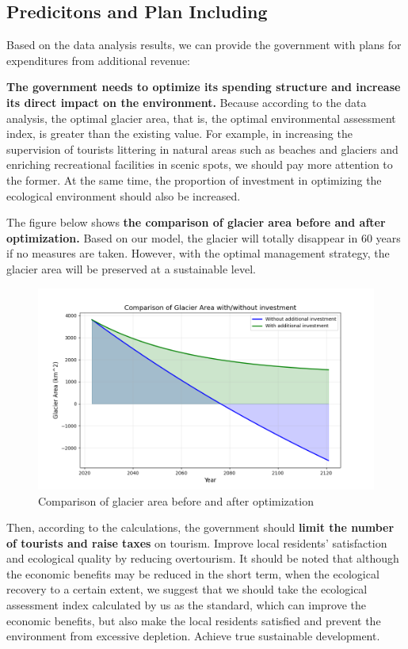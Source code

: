 \documentclass[UTF8]{mcmthesis}
\begin{document}
        \subsection{Predicitons and Plan Including}
		Based on the data analysis results, we can provide the government with plans for expenditures from additional revenue:

		\textbf{The government needs to optimize its spending structure and increase its direct impact on the environment.} Because according to the data analysis, the optimal glacier area, that is, the optimal environmental assessment index, is greater than the existing value. For example, in increasing the supervision of tourists littering in natural areas such as beaches and glaciers and enriching recreational facilities in scenic spots, we should pay more attention to the former. At the same time, the proportion of investment in optimizing the ecological environment should also be increased.
		
        The figure below shows \textbf{the comparison of glacier area before and after optimization.} Based on our model, the glacier will totally disappear in 60 years if no measures are taken. However, with the optimal management strategy, the glacier area will be preserved at a sustainable level.
        \begin{figure}[htbp]
            \centering
            \includegraphics[width=13cm]{predict.png}
            \caption{Comparison of glacier area before and after optimization}
        \end{figure}
        
        Then, according to the calculations, the government should \textbf{limit the number of tourists and raise taxes} on tourism. Improve local residents' satisfaction and ecological quality by reducing overtourism. It should be noted that although the economic benefits may be reduced in the short term, when the ecological recovery to a certain extent, we suggest that we should take the ecological assessment index calculated by us as the standard, which can improve the economic benefits, but also make the local residents satisfied and prevent the environment from excessive depletion. Achieve true sustainable development.
        
\end{document}
